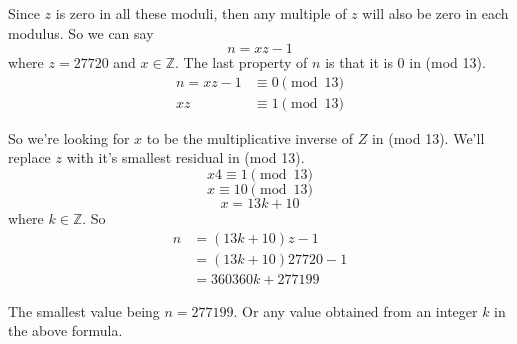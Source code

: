 \documentclass[12pt]{article}
\newcommand{\Z}{\mathbb{Z}}
\begin{document}
Since $z$ is zero in all these moduli, then any multiple of $z$ will also be zero in each modulus. So we can say
\[n = xz - 1\]
where $z=27720$ and $x\in \Z$. The last property of $n$ is that it is 0 in (mod 13).
\begin{align*}
    n = xz - 1 &\equiv 0 \pmod{13} \\
    xz &\equiv 1 \pmod{13}
\end{align*}

So we're looking for $x$ to be the multiplicative inverse of $Z$ in (mod 13). We'll replace $z$ with it's smallest residual in (mod 13).
\[x4 \equiv 1 \pmod{13}\]
\[x \equiv 10 \pmod{13}\]
\[x = 13k + 10\]
where $k \in \Z$. So
\begin{align*}
    n &= (13k + 10)z - 1 \\
      &= (13k + 10)27720 - 1 \\
      &= 360360k + 277199
\end{align*}

The smallest value being $n=277199$. Or any value obtained from an integer $k$ in the above formula.
\end{document}
